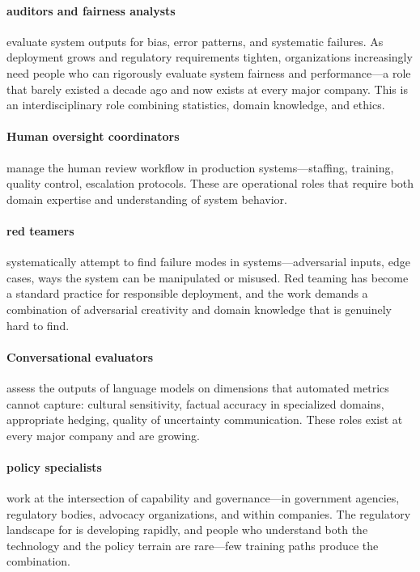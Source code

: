 \paragraph{\ai auditors and fairness analysts} evaluate \ai system outputs for bias, error patterns, and systematic failures. As \ai deployment grows and regulatory requirements tighten, organizations increasingly need people who can rigorously evaluate \ai system fairness and performance---a role that barely existed a decade ago and now exists at every major \ai company. This is an interdisciplinary role combining statistics, domain knowledge, and ethics.

\paragraph{Human oversight coordinators} manage the human review workflow in production \hitl systems---staffing, training, quality control, escalation protocols. These are operational roles that require both domain expertise and understanding of \ai system behavior.

\paragraph{\ai red teamers} systematically attempt to find failure modes in \ai systems---adversarial inputs, edge cases, ways the system can be manipulated or misused. Red teaming has become a standard practice for responsible \ai deployment, and the work demands a combination of adversarial creativity and domain knowledge that is genuinely hard to find.

\paragraph{Conversational \ai evaluators} assess the outputs of language models on dimensions that automated metrics cannot capture: cultural sensitivity, factual accuracy in specialized domains, appropriate hedging, quality of uncertainty communication. These roles exist at every major \ai company and are growing.

\paragraph{\ai policy specialists} work at the intersection of \ai capability and governance---in government agencies, regulatory bodies, advocacy organizations, and within \ai companies. The regulatory landscape for \ai is developing rapidly, and people who understand both the technology and the policy terrain are rare---few training paths produce the combination.

